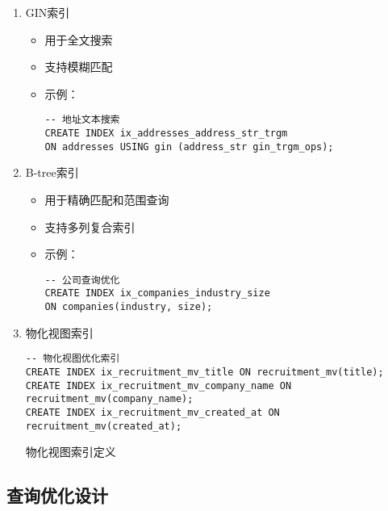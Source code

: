 \begin{enumerate}
  \item GIN索引
  \begin{itemize}
    \item 用于全文搜索
    \item 支持模糊匹配
    \item 示例：
    \begin{verbatim}
-- 地址文本搜索
CREATE INDEX ix_addresses_address_str_trgm 
ON addresses USING gin (address_str gin_trgm_ops);
    \end{verbatim}
  \end{itemize}

  \item B-tree索引
  \begin{itemize}
    \item 用于精确匹配和范围查询
    \item 支持多列复合索引
    \item 示例：
    \begin{verbatim}
-- 公司查询优化
CREATE INDEX ix_companies_industry_size 
ON companies(industry, size);
    \end{verbatim}
  \end{itemize}

  \item 物化视图索引
  \begin{listing}[htbp]
    \begin{verbatim}
-- 物化视图优化索引
CREATE INDEX ix_recruitment_mv_title ON recruitment_mv(title);
CREATE INDEX ix_recruitment_mv_company_name ON recruitment_mv(company_name);
CREATE INDEX ix_recruitment_mv_created_at ON recruitment_mv(created_at);
    \end{verbatim}
    \caption{物化视图索引定义}\label{lst:materialized_view_indexes}
  \end{listing}
\end{enumerate}

\subsection{查询优化设计}

